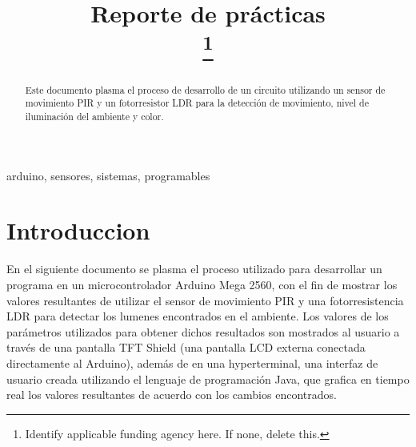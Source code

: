 \documentclass[conference]{IEEEtran}
\begin{document}
\title{Reporte de prácticas\\
\thanks{Identify applicable funding agency here. If none, delete this.}
}

\author{



}

\maketitle

\begin{abstract}
Este documento plasma el proceso de desarrollo de un circuito utilizando un sensor de movimiento PIR y un fotorresistor LDR para la detección de movimiento, nivel de iluminación del ambiente y color.
\end{abstract}

\begin{IEEEkeywords}
arduino, sensores, sistemas, programables
\end{IEEEkeywords}

\section{Introduccion}
En el siguiente documento se plasma el proceso utilizado para desarrollar un programa en un microcontrolador Arduino Mega 2560, con el fin de mostrar los valores resultantes de utilizar el sensor de movimiento PIR y una fotorresistencia LDR para detectar los lumenes encontrados en el ambiente. Los valores de los parámetros utilizados para obtener dichos resultados son mostrados al usuario a través de una pantalla TFT Shield (una pantalla LCD externa conectada directamente al Arduino), además de en una hyperterminal, una interfaz de usuario creada utilizando el lenguaje de programación Java, que grafica en tiempo real los valores resultantes de acuerdo con los cambios encontrados.
\end{document}
